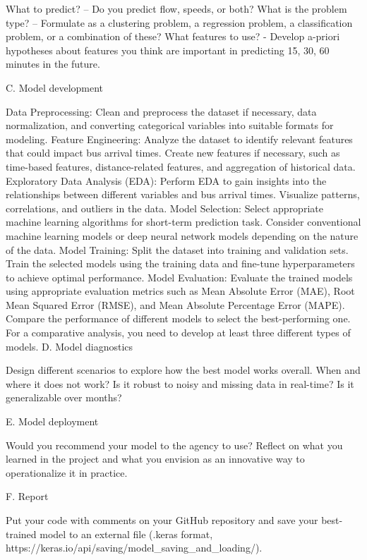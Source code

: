 What to predict? – Do you predict flow, speeds, or both?
What is the problem type? – Formulate as a clustering problem, a regression problem, a classification problem, or a combination of these? 
What features to use? - Develop a-priori hypotheses about features you think are important in predicting 15, 30, 60 minutes in the future. 

C. Model development  

Data Preprocessing: Clean and preprocess the dataset if necessary, data normalization, and converting categorical variables into suitable formats for modeling.
Feature Engineering: Analyze the dataset to identify relevant features that could impact bus arrival times. Create new features if necessary, such as time-based features, distance-related features, and aggregation of historical data.
Exploratory Data Analysis (EDA): Perform EDA to gain insights into the relationships between different variables and bus arrival times. Visualize patterns, correlations, and outliers in the data.
Model Selection: Select appropriate machine learning algorithms for short-term prediction task. Consider conventional machine learning models or deep neural network models depending on the nature of the data. 
Model Training: Split the dataset into training and validation sets. Train the selected models using the training data and fine-tune hyperparameters to achieve optimal performance.
Model Evaluation: Evaluate the trained models using appropriate evaluation metrics such as Mean Absolute Error (MAE), Root Mean Squared Error (RMSE), and Mean Absolute Percentage Error (MAPE). Compare the performance of different models to select the best-performing one. For a comparative analysis, you need to develop at least three different types of models. 
D. Model diagnostics  

Design different scenarios to explore how the best model works overall. When and where it does not work? Is it robust to noisy and missing data in real-time? Is it generalizable over months?  

E. Model deployment  

Would you recommend your model to the agency to use?  Reflect on what you learned in the project and what you envision as an innovative way to operationalize it in practice.  

F. Report

Put your code with comments on your GitHub repository and save your best-trained model to an external file (.keras format, https://keras.io/api/saving/model_saving_and_loading/).

